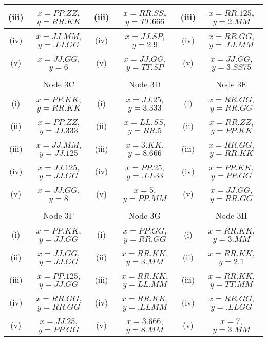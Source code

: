 \documentclass[a4paper,12pt]{article}
\begin{document}
\begin{tabular}{||c|c||c|c||c|c||}
		\hline (iii) & $x= PP.ZZ$, $y= RR.KK$  & (iii) & $x= RR.SS$, $y =TT.666 $ &(iii) & $x= RR.125$, $y= 2.MM$ \\  \hline
		\hline (iv)  & $x= JJ.MM$, $y= .LLGG$  & (iv) & $x= JJ.SP$, $y = 2.9$ & (iv)  & $x= RR.GG$, $y= .LLMM$\\  \hline
		\hline (v) & $x= JJ.GG$, $y= 6$ & (v) & $x= JJ.GG$, $y= TT.SP $  &(v) & $x= JJ.GG$, $y= 3.SS75$\\  \hline & & & & & \\
		\hline 
		\hline  & Node 3C &   & Node 3D &  & Node 3E  \\  \hline
		\hline (i) & $x= PP.KK$, $y= RR.KK$ &  (i) & $x= JJ.25$, $y = 3.333$  & (i)  & $x= RR.GG$, $y= RR.GG$\\  \hline
		\hline (ii) & $x= PP.ZZ$, $y= JJ.333$  & (ii) & $x= LL.SS$, $y =RR.5 $ &(ii) & $x= RR.ZZ$, $y= PP.KK$ \\  \hline
		\hline (iii)  & $x= JJ.MM$, $y= JJ.125$  & (iii) & $x= 3.KK$, $y = 8.666$ & (iii)  & $x= RR.GG$, $y= RR.KK$\\  \hline
		\hline (iv)  & $x= JJ.125$, $y = JJ.GG$  &  (iv) & $x= PP.25$, $y = .LL33$ & (iv) & $x= PP.KK$, $y= PP.GG$ \\  \hline
		\hline (v) & $x= JJ.GG$, $y= 8$ & (v) & $x= 5 $, $y= PP.MM$  &(v) & $x= JJ.GG$, $y= RR.GG$\\  \hline & & & & & \\
		\hline 
		\hline  &  Node 3F &  & Node 3G &   & Node 3H \\  \hline
		\hline (i) & $x= PP.KK$, $y= JJ.GG$ & (i) & $x= PP.GG$, $y = RR.GG$  & (i)  & $x= RR.KK$, $y= 3.MM$\\  \hline
		\hline (ii)  & $x= JJ.GG$, $y = JJ.GG$  & (ii) & $x= RR.KK $, $y= 3.MM$ & (ii) & $x= RR.KK$, $y = 2.1$ \\  \hline
		\hline (iii) & $x= PP.125$, $y = JJ.GG $   & (iii) & $x= RR.KK$, $y= LL.MM$ &(iii) & $x= RR.KK$, $y= TT.MM$ \\  \hline
		\hline (iv)  & $x= RR.GG$, $y= RR.GG$  & (iv) & $x= RR.KK$, $y= .LLMM$ & (iv)  & $x= RR.GG $, $y = .LLGG$\\  \hline
		\hline (v) & $x= JJ.25$, $y = PP.GG$ & (v)  & $x= 3.666$, $y = 8.MM $ & (v) & $x= 7$, $y= 3.MM$\\  \hline
		\hline 
		
	\end{tabular} 
\end{document}
